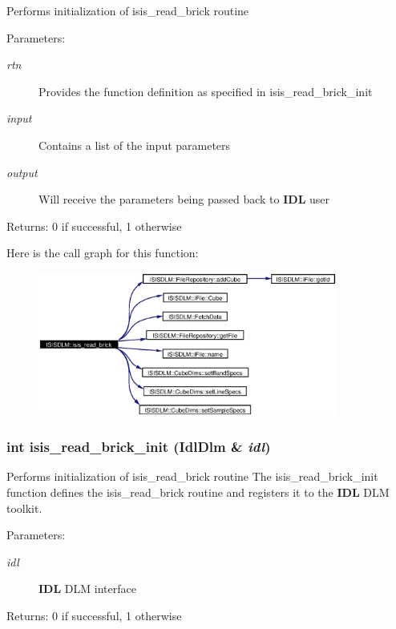 Performs initialization of isis\_\-read\_\-brick routine \begin{Desc}
\item[Parameters:]
\begin{description}
\item[{\em rtn}]Provides the function definition as specified in isis\_\-read\_\-brick\_\-init \item[{\em input}]Contains a list of the input parameters \item[{\em output}]Will receive the parameters being passed back to {\bf IDL} user \end{description}
\end{Desc}
\begin{Desc}
\item[Returns:]0 if successful, 1 otherwise \end{Desc}


Here is the call graph for this function:\begin{figure}[H]
\begin{center}
\leavevmode
\includegraphics[width=279pt]{namespaceISISDLM_a31_cgraph}
\end{center}
\end{figure}
\subsubsection{\setlength{\rightskip}{0pt plus 5cm}int isis\_\-read\_\-brick\_\-init (Idl\-Dlm \& {\em idl})}\label{namespaceISISDLM_a30}


Performs initialization of isis\_\-read\_\-brick routine The isis\_\-read\_\-brick\_\-init function defines the isis\_\-read\_\-brick routine and registers it to the {\bf IDL} DLM toolkit. \begin{Desc}
\item[Parameters:]
\begin{description}
\item[{\em idl}]{\bf IDL} DLM interface \end{description}
\end{Desc}
\begin{Desc}
\item[Returns:]0 if successful, 1 otherwise \end{Desc}


